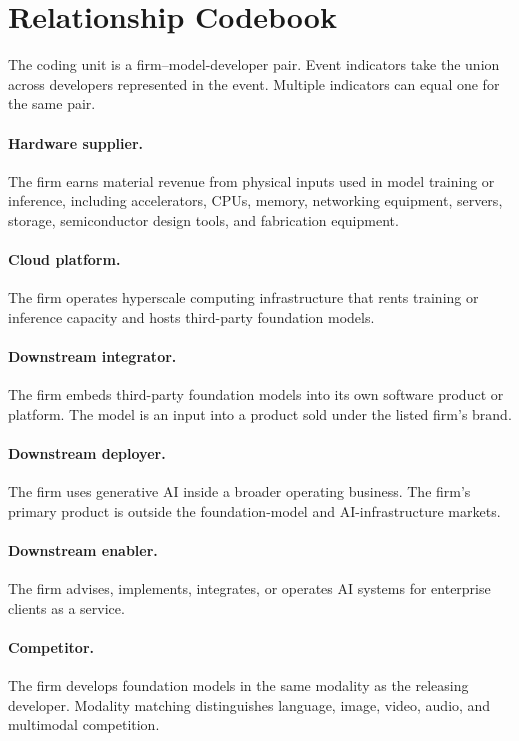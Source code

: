 \documentclass[12pt]{article}
\begin{document}
\section{Relationship Codebook}

The coding unit is a firm--model-developer pair. Event indicators take the
union across developers represented in the event. Multiple indicators can
equal one for the same pair.

\paragraph{Hardware supplier.}
The firm earns material revenue from physical inputs used in model training
or inference, including accelerators, CPUs, memory, networking equipment,
servers, storage, semiconductor design tools, and fabrication equipment.

\paragraph{Cloud platform.}
The firm operates hyperscale computing infrastructure that rents training
or inference capacity and hosts third-party foundation models.

\paragraph{Downstream integrator.}
The firm embeds third-party foundation models into its own software product
or platform. The model is an input into a product sold under the listed
firm's brand.

\paragraph{Downstream deployer.}
The firm uses generative AI inside a broader operating business. The
firm's primary product is outside the foundation-model and AI-infrastructure
markets.

\paragraph{Downstream enabler.}
The firm advises, implements, integrates, or operates AI systems for
enterprise clients as a service.

\paragraph{Competitor.}
The firm develops foundation models in the same modality as the releasing
developer. Modality matching distinguishes language, image, video, audio,
and multimodal competition.
\end{document}
